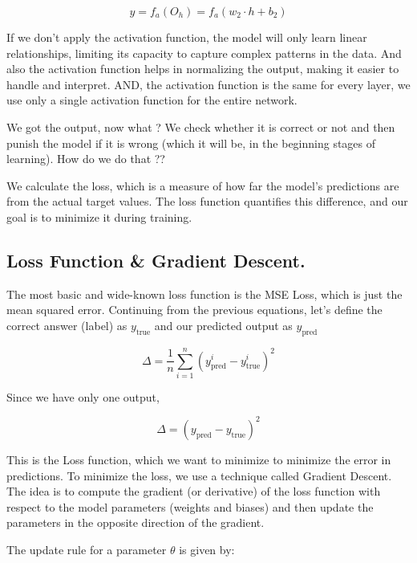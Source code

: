 \documentclass[12pt]{article}
\begin{document}
\[
    y = f_{a} (O_{h}) = f_{a} (w_2 \cdot h + b_2)
\]

\vspace{0.1in}

\begin{imp}
    If we don't apply the activation function, the model will only learn linear relationships, limiting its capacity to capture complex patterns in the data. And also the activation function helps in normalizing the output, making it easier to handle and interpret. AND, the activation function is the same for every layer, we use only a single activation function for the entire network. 
\end{imp}

\vspace{0.1in}

We got the output, now what ? We check whether it is correct or not and then punish the model if it is wrong (which it will be, in the beginning stages of learning). How do we do that ??

We calculate the loss, which is a measure of how far the model's predictions are from the actual target values. The loss function quantifies this difference, and our goal is to minimize it during training.

\subsection*{Loss Function \& Gradient Descent.}

The most basic and wide-known loss function is the MSE Loss, which is just the mean squared error. Continuing from the previous equations, let's define the correct answer (label) as \(y_{\text{true} }\) and our predicted output as \(y_{\text{pred} } \) 

\[
    \Delta = \frac{1}{n} \sum_{i=1}^{n} (y_{\text{pred} }^i - y_{\text{true} }^i)^2
\]

Since we have only one output, 

\[
    \Delta =  (y_{\text{pred} } - y_{\text{true} })^2
\]

This is the Loss function, which we want to minimize to minimize the error in predictions. To minimize the loss, we use a technique called Gradient Descent. The idea is to compute the gradient (or derivative) of the loss function with respect to the model parameters (weights and biases) and then update the parameters in the opposite direction of the gradient.

The update rule for a parameter \( \theta  \) is given by:
\end{document}
